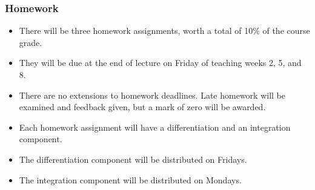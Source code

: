 \begin{frame}
\frametitle{Homework}
\begin{itemize}
\item  There will be three homework assignments, worth a total of 10\% of the course grade.
\item  They will be due at the end of lecture on Friday of teaching weeks 2, 5, and 8.
\item  There are no extensions to homework deadlines.  Late homework will be examined and feedback given, but a mark of zero will be awarded.
\item  Each homework assignment will have a differentiation and an integration component.  
\item  The differentiation component will be distributed on Fridays.
\item  The integration component will be distributed on Mondays.
\end{itemize}
\end{frame}
